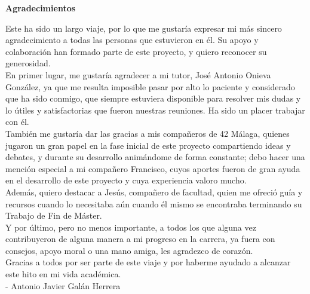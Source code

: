 \begin{center}

    \textbf{Agradecimientos} \\

\end{center}

Este ha sido un largo viaje, por lo que me gustaría expresar mi más sincero agradecimiento a todas las personas que estuvieron en él. Su apoyo y colaboración han formado parte de este proyecto, y quiero reconocer su generosidad.
\\

En primer lugar, me gustaría agradecer a mi tutor, José Antonio Onieva González, ya que me resulta imposible pasar por alto lo paciente y considerado que ha sido conmigo, que siempre estuviera disponible para resolver mis dudas y lo útiles y satisfactorias que fueron nuestras reuniones. Ha sido un placer trabajar con él.
\\

También me gustaría dar las gracias a mis compañeros de 42 Málaga, quienes jugaron un gran papel en la fase inicial de este proyecto compartiendo ideas y debates, y durante su desarrollo animándome de forma constante; debo hacer una mención especial a mi compañero Francisco, cuyos aportes fueron de gran ayuda en el desarrollo de este proyecto y cuya experiencia valoro mucho.
\\

Además, quiero destacar a Jesús, compañero de facultad, quien me ofreció guía y recursos cuando lo necesitaba aún cuando él mismo se encontraba terminando su Trabajo de Fin de Máster.
\\

Y por último, pero no menos importante, a todos los que alguna vez contribuyeron de alguna manera a mi progreso en la carrera, ya fuera con consejos, apoyo moral o una mano amiga, les agradezco de corazón.
\\

Gracias a todos por ser parte de este viaje y por haberme ayudado a alcanzar este hito en mi vida académica.
\\

- Antonio Javier Galán Herrera
